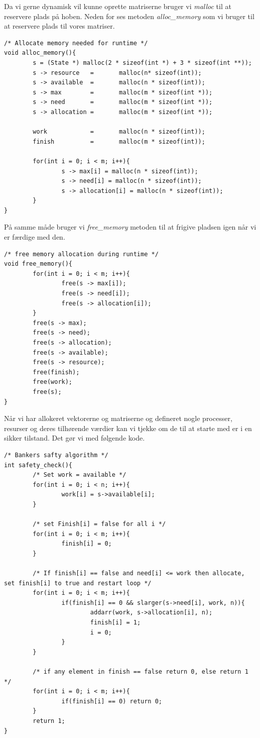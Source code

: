 \documentclass[danish]{report}
\begin{document}
Da vi gerne dynamisk vil kunne oprette matriserne bruger vi \textit{malloc} 
til at reservere plads på hoben. Neden for ses metoden \textit{alloc\_memory} som vi bruger til at reservere plads til vores matriser. 

\begin{lstlisting}
/* Allocate memory needed for runtime */
void alloc_memory(){
        s = (State *) malloc(2 * sizeof(int *) + 3 * sizeof(int **));
        s -> resource   =       malloc(n* sizeof(int));
        s -> available  =       malloc(n * sizeof(int));
        s -> max        =       malloc(m * sizeof(int *));
        s -> need       =       malloc(m * sizeof(int *));
        s -> allocation =       malloc(m * sizeof(int *));

        work            =       malloc(n * sizeof(int));
        finish          =       malloc(m * sizeof(int));

        for(int i = 0; i < m; i++){
                s -> max[i] = malloc(n * sizeof(int));
                s -> need[i] = malloc(n * sizeof(int));
                s -> allocation[i] = malloc(n * sizeof(int));
        }
}
\end{lstlisting}

På samme måde bruger vi \textit{free\_memory} metoden  til at frigive pladsen igen når vi er færdige med den.
\begin{lstlisting}
/* free memory allocation during runtime */
void free_memory(){
        for(int i = 0; i < m; i++){
                free(s -> max[i]);
                free(s -> need[i]);
                free(s -> allocation[i]);
        }
        free(s -> max);
        free(s -> need);
        free(s -> allocation);
        free(s -> available);
        free(s -> resource);
        free(finish);
        free(work);
        free(s);
}
\end{lstlisting}

Når vi har allokeret vektorerne og matriserne og defineret nogle processer, resurser og deres tilhørende værdier kan vi tjekke om de til at starte med er i en sikker tilstand. Det gør vi med følgende kode.

\begin{lstlisting}
/* Bankers safty algorithm */
int safety_check(){
        /* Set work = available */
        for(int i = 0; i < n; i++){
                work[i] = s->available[i];
        }

        /* set Finish[i] = false for all i */
        for(int i = 0; i < m; i++){
                finish[i] = 0;
        }

        /* If finish[i] == false and need[i] <= work then allocate, set finish[i] to true and restart loop */
        for(int i = 0; i < m; i++){
                if(finish[i] == 0 && slarger(s->need[i], work, n)){
                        addarr(work, s->allocation[i], n);
                        finish[i] = 1;
                        i = 0;
                }
        }

        /* if any element in finish == false return 0, else return 1  */
        for(int i = 0; i < m; i++){
                if(finish[i] == 0) return 0;
        }
        return 1;
}
\end{lstlisting}
\end{document}
